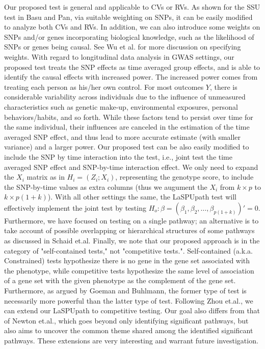\documentclass[12pt]{article}
\begin{document}
Our proposed test is general and applicable to CVs or RVs. As shown for the SSU test in Basu and Pan,\cite{Basu2011} via suitable weighting on SNPs, it can be easily modified to analyze both CVs and RVs. In addition, we can also introduce some weights on SNPs and/or genes incorporating biological knowledge, such as the likelihood of SNPs or genes being causal. See Wu et al.\cite{Wu2011} for more discussion on specifying weights. With regard to longitudinal data analysis in GWAS settings, our proposed test treats the SNP effects as time averaged group effects, and is able to identify the causal effects with increased power. The increased power comes from treating each person as his/her own control. For most outcomes $Y$, there is considerable variability across individuals due to the influence of unmeasured characteristics such as genetic make-up, environmental exposures, personal behaviors/habits, and so forth. While these factors tend to persist over time for the same individual, their influences are canceled in the estimation of the time averaged SNP effect, and thus lead to more accurate estimate (with smaller variance) and a larger power. Our proposed test can be also easily modified to include the SNP by time interaction into the test, i.e., joint test the time averaged SNP effect and SNP-by-time interaction effect. We only need to expand the $X_i$ matrix as in $H_i = (Z_i;X_i)$, representing the genotype score, to include the SNP-by-time values as extra columns (thus we augument the $X_i$ from $k \times p$ to $k \times p(1+k)$). With all other settings the same, the LaSPUpath test will effectively implement the joint test by testing  $H_{o}:\beta=(\beta_{1},\beta_{2},\ldots,\beta_{p(1+k)})'=0$. Furthermore, we have focused on testing on a single pathway; an alternative is to take account of possible overlapping or hierarchical structures of some pathways as discussed in Schaid et.al.\cite{Schaid2012} Finally, we note that our proposed approach is in the category of "self-contained tests," not "competitive tests."\cite{Goeman2007,Liu2007,Nam2008,Wang2010,Fridley2010,Fridley2011}. Self-contained (a.k.a. Constrained) tests hypothesize there is no gene in the gene set associated with the phenotype, while competitive tests hypothesize the same level of association of a gene set with the given phenotype as the complement of the gene set. Furthermore, as argued by Goeman and Buhlmann,\cite{Goeman2007} the former type of test is necessarily more powerful than the latter type of test. Following Zhou et.al.,\cite{Zhou2013} we can extend our LaSPUpath to competitive testing. Our goal also differs from that of Newton et.al.,\cite{Newton2012} which goes beyond only identifying significant pathways, but also aims to uncover the common theme shared among the identified significant pathways. These extensions are very interesting and warrant future investigation.
\end{document}
